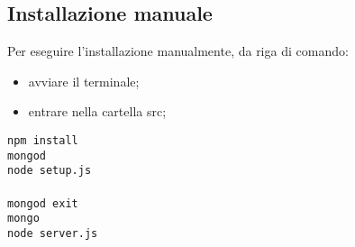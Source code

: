\documentclass[12pt,a4paper]{article}
\begin{document}
	\subsection{Installazione manuale}
	Per eseguire l'installazione manualmente, da riga di comando:
	\begin{itemize}
		\item avviare il terminale;
		\item entrare nella cartella src;
	\end{itemize}
			\begin{center} \texttt{npm install \\
			 mongod\\
			 node setup.js \\ \\
			 mongod exit\\
			 mongo\\
			 node server.js}\\\end{center}
	
\end{document}
